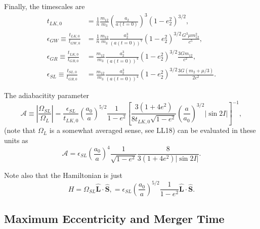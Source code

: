 \documentclass[11pt,
        usenames, %
        dvipsnames %
    ]{article}
\newcommand*{\bm}[1]{\boldsymbol{\mathbf{#1}}}
\newcommand*{\abs}[1]{\left|#1\right|}
\newcommand*{\p}[1]{\left(#1\right)}
\newcommand*{\s}[1]{\left[#1\right]}
\begin{document}
Finally, the timescales are
\begin{align}
    t_{LK, 0} &= \frac{1}{n}
        \frac{m_{12}}{m_3}\p{\frac{a_2}{a(t = 0)}}^3 \p{1 - e_2^2}^{3/2},\\
    \epsilon_{GW} \equiv \frac{t_{LK, 0}}{t_{GW, 0}}
        &= \frac{1}{n}
            \frac{m_{12}}{m_3}\frac{a_2^3}{\p{a(t = 0)}^7} \p{1 - e_2^2}^{3/2}
            \frac{G^3 \mu m_{12}^2}{c^5},\\
    \epsilon_{GR} \equiv \frac{t_{LK, 0}}{t_{GR, 0}}
        &= \frac{m_{12}}{m_3}\frac{a_2^3}{\p{a(t = 0)}^4} \p{1 - e_2^2}^{3/2}
            \frac{3Gm_{12}}{c^2},\\
    \epsilon_{SL} \equiv \frac{t_{SL, 0}}{t_{GR, 0}}
        &= \frac{m_{12}}{m_3}\frac{a_2^3}{\p{a(t = 0)}^4} \p{1 - e_2^2}^{3/2}
            \frac{3G\p{m_2 + \mu/3}}{2c^2}.
\end{align}

The adiabacitity parameter
\begin{equation}
    \mathcal{A} \equiv \abs{\frac{\Omega_{SL}}{\Omega_L}}
        = \frac{\epsilon_{SL}}{t_{LK, 0}}
            \p{\frac{a_0}{a}}^{5/2}\frac{1}{1 - e^2}
            \s{\frac{3(1 + 4e^2)}{8t_{LK, 0}\sqrt{1 - e^2}}
                \p{\frac{a}{a_0}}^{3/2}\abs{\sin 2I}}^{-1},
\end{equation}
(note that $\Omega_L$ is a somewhat averaged sense, see LL18) can be evaluated
in these units as
\begin{equation}
    \mathcal{A} = \epsilon_{SL}\p{\frac{a_0}{a}}^4\frac{1}{\sqrt{1 - e^2}}
        \frac{8}{3\p{1 + 4e^2}\abs{\sin 2I}}.
\end{equation}

Note also that the Hamiltonian is just
\begin{equation}
    H = \Omega_{SL} \hat{\bm{L}} \cdot \hat{\bm{S}},
        = \epsilon_{SL}\p{\frac{a_0}{a}}^{5/2} \frac{1}{1 - e^2}
            \hat{\bm{L}} \cdot \hat{\bm{S}}.
\end{equation}

\subsection{Maximum Eccentricity and Merger Time}
\end{document}
